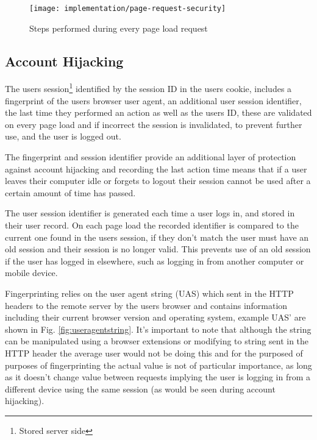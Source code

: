 \begin{figure}[h]
    \centering
    \texttt{[image: implementation/page-request-security]}
    \caption{Steps performed during every page load request}
    \label{fig:page-request-security}
    
    \begin{comment}
(start)->(Page Request)
(Page Request)->(Compare FingerPrint)
(Page Request)->(Redirect to HTTPS Equivalent)->(Compare FingerPrint)
(Compare FingerPrint)->(Compare User Session ID)
(Compare FingerPrint)->(Invalidate Session)->[Login Page]
(Compare User Session ID)->(Invalidate Session)
(Compare User Session ID)->[Requested Page]->(end)
    \end{comment}
\end{figure}


\subsection{Account Hijacking}
The users session\footnote{Stored server side} identified by the session ID in the users cookie,  includes a fingerprint of the users browser user agent, an additional user session identifier, the last time they performed an action as well as the users ID, these are validated on every page load and if incorrect the session is invalidated, to prevent further use, and the user is logged out.


The fingerprint and session identifier provide an additional layer of protection against account hijacking and recording the last action time means that if a user leaves their computer idle or forgets to logout their session cannot be used after a certain amount of time has passed.

The user session identifier is generated each time a user logs in, and stored in their user record. On each page load the recorded identifier is compared to the current one found in the users session, if they don't match the user must have an old session and their session is no longer valid. This prevents use of an old session if the user has logged in elsewhere, such as logging in from another computer or mobile device.

Fingerprinting relies on the user agent string (UAS) which sent in the HTTP headers to the remote server by the users browser and contains information including their current browser version and operating system, example UAS' are shown in Fig. \ref{fig:useragentstring}. It's important to note that although the string can be manipulated using a browser extensions or modifying to string sent in the HTTP header the average user would not be doing this and for the purposed of purposes of fingerprinting the actual value is not of particular importance, as long as it doesn't change value between requests implying the user is logging in from a different device using the same session (as would be seen during account hijacking).

